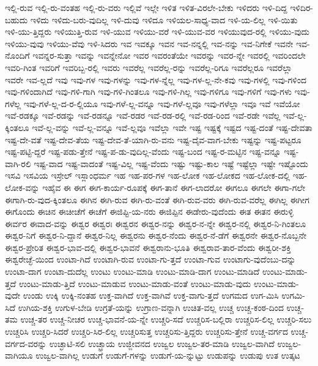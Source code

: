 {ಇಲ್ಲಿ-ರುವ
ಇಲ್ಲಿ-ರು-ವಂತಹ
ಇಲ್ಲಿ-ರು-ವರು
ಇಲ್ಲಿವೆ
ಇಲ್ಲೇ
ಇಳಿತ
ಇಳಿತ-ವಿರಲೇ-ಬೇಕು
ಇಳಿದರು
ಇಳಿ-ದಿದ್ದ
ಇಳಿದಿರ-ಬಹುದು
ಇಳಿದು
ಇಳಿದು-ಬರು-ವುದಿಲ್ಲ
ಇಳಿ-ದುವು
ಇಳಿದೂ
ಇಳಿಯಲ-ಸಾಧ್ಯ-ವಾದ
ಇಳಿ-ಯ-ಲಿಲ್ಲ
ಇಳಿ-ಯಿತು
ಇಳಿ-ಯು-ತ್ತಿದ್ದರು
ಇಳಿಯುತ್ತಿ-ರುವ
ಇಳಿ-ಯುವ
ಇಳಿಯು-ವರೆ
ಇಳಿ-ಯುವ-ವರ
ಇಳಿಯುವುದ-ರಲ್ಲಿ
ಇಳಿಯು-ವುದು
ಇಳಿಯು-ವುವು
ಇಳಿಯು-ವೆವು
ಇಳಿ-ಸಿದರು
ಇವ
ಇವಕ್ಕೂ
ಇವನ
ಇವ-ನನ್ನಲ್ಲಿ
ಇವ-ನನ್ನು
ಇವ-ನಿಗೇಕೆ
ಇವನೇ
ಇವ-ನೊಂದಿಗೆ
ಇವನ್ನರ-ಸುತ್ತಾ
ಇವನ್ನು
ಇವನ್ನೇನೋ
ಇವರ
ಇವರಂತೆಯೇ
ಇವರನ್ನು
ಇವರ-ನ್ನೇ
ಇವರಲ್ಲಿ
ಇವರಿಂದಲೇ
ಇವರಿ-ಗಿಂತ
ಇವರಿಗೆ
ಇವರಿಬ್ಬ-ರಲ್ಲಿ
ಇವರು
ಇವರೆಲ್ಲ
ಇವರೆಲ್ಲ-ರನ್ನು
ಇವರೆಲ್ಲ-ರಿಗೂ
ಇವರೆಲ್ಲರೂ
ಇವರೆಲ್ಲಾ
ಇವರೇ
ಇವ-ಲ್ಲದೆ
ಇವು
ಇವು-ಗಳ
ಇವು-ಗಳನ್ನು
ಇವು-ಗಳ-ನ್ನೆಲ್ಲ
ಇವು-ಗಳ-ಲ್ಲ-ನೇ-ಕವು
ಇವು-ಗಳಲ್ಲಿ
ಇವು-ಗಳಿಂದ
ಇವು-ಗಳಿಂದಾಗಿದೆ
ಇವು-ಗಳಿ-ಗಾಗಿ
ಇವು-ಗಳಿ-ಗಿಂತಲೂ
ಇವು-ಗಳಿ-ಗಿಲ್ಲ
ಇವು-ಗಳಿಗೂ
ಇವು-ಗಳಿಗೆ
ಇವು-ಗಳು
ಇವು-ಗಳೆಲ್ಲ
ಇವು-ಗಳೆ-ಲ್ಲ-ದ-ರ-ಲ್ಲಿಯೂ
ಇವು-ಗಳೆ-ಲ್ಲ-ವನ್ನೂ
ಇವು-ಗಳೆ-ಲ್ಲವೂ
ಇವು-ಗಳೆಲ್ಲಾ
ಇವೂ
ಇವೆ
ಇವೆಯೋ
ಇವೆ-ರಡಕ್ಕೂ
ಇವೆ-ರಡನ್ನು
ಇವೆ-ರಡನ್ನೂ
ಇವೆ-ರಡರ
ಇವೆ-ರಡ-ರಲ್ಲಿ
ಇವೆ-ರಡ-ರಿಂದ
ಇವೆ-ರಡೇ
ಇವೆಲ್ಲ
ಇವೆ-ಲ್ಲ-ಕ್ಕಿಂತಲೂ
ಇವೆ-ಲ್ಲ-ವನ್ನು
ಇವೆ-ಲ್ಲ-ವನ್ನೂ
ಇವೆ-ಲ್ಲವೂ
ಇವೆಲ್ಲಾ
ಇವೇ
ಇಷ್ಟ
ಇಷ್ಟಕ್ಕೆ
ಇಷ್ಟದ
ಇಷ್ಟ-ದಂತೆ
ಇಷ್ಟ-ದೇವತಾ
ಇಷ್ಟ-ದೇ-ವತೆ
ಇಷ್ಟ-ದೇವ-ತೆಯ
ಇಷ್ಟ-ದೇವ-ತೆ-ಯಾಗಿ-ರು-ವನು
ಇಷ್ಟ-ದೈವ-ವಾಗ-ಬೇಕು
ಇಷ್ಟನ್ನು
ಇಷ್ಟ-ಪಟ್ಟರೂ
ಇಷ್ಟ-ಪಟ್ಟಿ-ದ್ದರೆ
ಇಷ್ಟ-ಪಡು-ತ್ತೇನೆ
ಇಷ್ಟ-ಪ-ಡು-ವುದಿಲ್ಲ-ವೆಂದು
ಇಷ್ಟ-ಬಂದ
ಇಷ್ಟ-ರ-ಮಟ್ಟಿನ
ಇಷ್ಟ-ವನ್ನೂ
ಇಷ್ಟ-ವಾಗಿ-ರಲಿ
ಇಷ್ಟ-ವಾದ
ಇಷ್ಟ-ವಾದಂತೆ
ಇಷ್ಟ-ವಿಲ್ಲ
ಇಷ್ಟ-ವೆಂದು
ಇಷ್ಟು
ಇಷ್ಟು-ಕಾಲ
ಇಷ್ಟೆ
ಇಷ್ಟೆಲ್ಲಾ
ಇಷ್ಟೇ
ಇಷ್ಟೊಂದು
ಇಸವಿ
ಇಸವಿಯ
ಇಸ್ರೇಲ್
ಇಸ್ಲಾಂಧರ್ಮ
ಇಹ
ಇಹ-ಪರ-ಗಳ
ಇಹ-ಲೋಕ
ಇಹ-ಲೋಕದ
ಇಹ-ಲೋಕ-ದಲ್ಲಿ
ಇಹ-ಲೋಕ-ವನ್ನು
ಇಹೈವ
ಈ
ಈಗ
ಈಗ-ಕಾರ್ಯ-ರೂಪಕ್ಕೆ
ಈಗ-ತಾನೆ
ಈಗ-ಲಾದರೋ
ಈಗಲೂ
ಈಗಲೇ
ಈಗಾ-ಗಲೇ
ಈಗಾಗಿ-ರು-ವುದ-ಕ್ಕಿಂತಲೂ
ಈಗಿನ
ಈಗಿ-ರುವ
ಈಗಿ-ರು-ವಂತೆ
ಈಗಿ-ರುವ-ವರು
ಈಗಿ-ರುವ-ವರೆಲ್ಲ
ಈಗಿಲ್ಲ
ಈಗೀಗ
ಈಗೊಂದು
ಈಚಿನ
ಈಚೀಚೆಗೆ
ಈಚೆಗೆ
ಈಜಿಪ್ಟಿ-ಯ-ನರು
ಈಜಿಪ್ಪಿನ
ಈಡೇರು-ವುದೆಂದು
ಈತ
ಈತನ
ಈರುಳ್ಳಿ
ಈರ್ವರ
ಈವಾದ-ವನ್ನು
ಈಶ್ವರ
ಈಶ್ವರಃ
ಈಶ್ವರನ
ಈಶ್ವರ-ನನ್ನು
ಈಶ್ವರ-ನ-ನ್ನೇ
ಈಶ್ವರ-ನಲ್ಲಿ
ಈಶ್ವರ-ನಿ-ಗಿಂತಲೂ
ಈಶ್ವರ-ನಿಗೆ
ಈಶ್ವರ-ನಿ-ದ್ದಾನೆ
ಈಶ್ವರ-ನಿಲ್ಲ
ಈಶ್ವರನು
ಈಶ್ವರ-ನೆಂದು
ಈಶ್ವರ-ನೆ-ಡೆಗೆ
ಈಶ್ವರನೇ
ಈಶ್ವರ-ನೊಬ್ಬನೇ
ಈಶ್ವರ-ಪ್ರೇರಿತ
ಈಶ್ವರ-ಭಾವ-ದಲ್ಲಿ
ಈಶ್ವರ-ಭಾವನೆ
ಈಶ್ವರಾನು-ಭೂತಿ
ಈಶ್ವರಾವ-ತಾರ-ವೆಂದು
ಈಶ್ವರೀ-ಶಕ್ತಿ
ಈಶ್ವರೇಚ್ಛೆ-ಯಿಂದ
ಉಂಟಾ-ಗಿದೆ
ಉಂಟಾಗಿ-ರುವ
ಉಂಟಾ-ಗು-ತ್ತದೆ
ಉಂಟಾ-ಗುವ
ಉಂಟಾಗು-ವುದೆಂಬು-ದನ್ನು
ಉಂಟಾ-ದಾಗ
ಉಂಟಾ-ದುದೆಲ್ಲ
ಉಂಟು
ಉಂಟು-ಮಾಡಿ
ಉಂಟು-ಮಾಡಿ-ದಾಗ
ಉಂಟು-ಮಾಡಿದೆ
ಉಂಟು-ಮಾಡು-ತ್ತದೆ
ಉಂಟು-ಮಾಡು-ತ್ತಿದೆ
ಉಂಟು-ಮಾಡುವ
ಉಂಟು-ಮಾಡು-ವಂತೆ
ಉಂಟು-ಮಾಡು-ವುದು
ಉಂಟು-ಮಾಡು-ವುದೇ
ಉಂಡು
ಉಕ್ಕಿ
ಉಕ್ಕಿ-ನಂತಹ
ಉಕ್ತ-ವಾಗಿದೆ
ಉಕ್ತ-ವಾಗಿವೆ
ಉಕ್ತ-ವಾಗು-ತ್ತದೆ
ಉಗಮದ
ಉಗ-ಮಿಸಿ
ಉಗಮಿ-ಸಿದೆ
ಉಗಿಯ-ಶಕ್ತಿ
ಉಗುಳ-ಬೇಡಿ
ಉಗ್ರತೆ-ಯನ್ನು
ಉಗ್ರಾಣ-ವನ್ನಾಗಿ
ಉಚಿತ-ವಲ್ಲ
ಉಚ್ಚ
ಉಚ್ಚ-ಕಂಠ-ದಿಂದ
ಉಚ್ಚ-ತಮ
ಉಚ್ಚ-ತರ
ಉಚ್ಚ-ನೀಚರ
ಉಚ್ಚ-ಭಾವನೆ-ಯ-ನ್ನೇ
ಉಚ್ಚರಿ-ಸದೆ
ಉಚ್ಚರಿಸ-ಬಲ್ಲಿರಾ
ಉಚ್ಚರಿಸ-ಲಿಲ್ಲ
ಉಚ್ಚರಿ-ಸಲು
ಉಚ್ಚರಿಸಿ
ಉಚ್ಚರಿ-ಸಿದರೆ
ಉಚ್ಚರಿ-ಸಿರ-ಲಿಲ್ಲ
ಉಚ್ಚರಿಸುತ್ತ
ಉಚ್ಚರಿಸು-ತ್ತಿದ್ದರು
ಉಚ್ಚರಿಸು-ತ್ತೇನೆ
ಉಚ್ಚ-ವರ್ಗದ
ಉಚ್ಚ-ವರ್ಗದ-ವರನ್ನು
ಉಚ್ಛಾಟಿ-ಸಲಿ
ಉಚ್ಛ್ರಾಯ
ಉಜ್ಜೀವನದ
ಉಜ್ವಲ
ಉಜ್ವಲ-ತರ-ಮಾಡಿ
ಉಜ್ವಲ-ವಾಗಿದೆ
ಉಜ್ವಲ-ವಾಗಿಯೂ
ಉಜ್ವಲ-ವಾಗಿಲ್ಲ
ಉಡುಗೆ
ಉಡುಗೆ-ಗಳನ್ನು
ಉಡುಗೆ-ಯ-ನ್ನುಟ್ಟು
ಉಡುಪನ್ನು
ಉಡುಪು
ಉತ
ಉತ್ಕಟ
}
